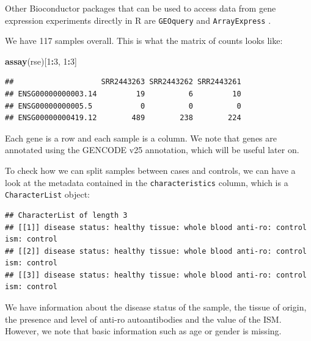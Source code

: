 \documentclass[9pt,a4paper,]{extarticle}
\newenvironment{Shaded}{\begin{snugshade}}{\end{snugshade}}
\newcommand{\KeywordTok}[1]{\textcolor[rgb]{0.13,0.29,0.53}{\textbf{#1}}}
\newcommand{\DecValTok}[1]{\textcolor[rgb]{0.00,0.00,0.81}{#1}}
\newcommand{\OperatorTok}[1]{\textcolor[rgb]{0.81,0.36,0.00}{\textbf{#1}}}
\newcommand{\NormalTok}[1]{#1}
\theoremstyle{definition}
\theoremstyle{definition}
\theoremstyle{definition}
\theoremstyle{remark}
\begin{document}
Other Bioconductor packages that can be used to access data from gene expression experiments directly in R are \texttt{GEOquery} \citep{Davis2007} and \texttt{ArrayExpress} \citep{Kauffmann2009}.

We have 117 samples overall.
This is what the matrix of counts looks like:

\begin{Shaded}
\begin{Highlighting}[]
\KeywordTok{assay}\NormalTok{(rse)[}\DecValTok{1}\OperatorTok{:}\DecValTok{3}\NormalTok{, }\DecValTok{1}\OperatorTok{:}\DecValTok{3}\NormalTok{]}
\end{Highlighting}
\end{Shaded}

\begin{verbatim}
##                    SRR2443263 SRR2443262 SRR2443261
## ENSG00000000003.14         19          6         10
## ENSG00000000005.5           0          0          0
## ENSG00000000419.12        489        238        224
\end{verbatim}

Each gene is a row and each sample is a column.
We note that genes are annotated using the GENCODE \citep{Harrow2012} v25 annotation, which will be useful later on.

To check how we can split samples between cases and controls, we can have a look at the metadata contained in the \texttt{characteristics} column, which is a \texttt{CharacterList} object:

\begin{Shaded}
\end{Shaded}

\begin{verbatim}
## CharacterList of length 3
## [[1]] disease status: healthy tissue: whole blood anti-ro: control ism: control
## [[2]] disease status: healthy tissue: whole blood anti-ro: control ism: control
## [[3]] disease status: healthy tissue: whole blood anti-ro: control ism: control
\end{verbatim}

We have information about the disease status of the sample, the tissue of origin, the presence and level of anti-ro autoantibodies and the value of the ISM.
However, we note that basic information such as age or gender is missing.
\end{document}
